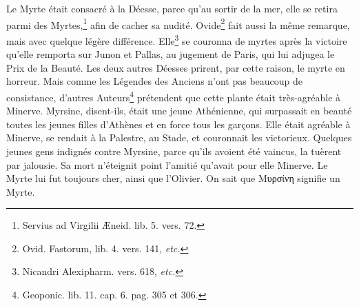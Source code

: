 \documentclass[a4paper, 11pt, oneside, polutonikogreek, french]{article}
\begin{document}
Le Myrte était consacré à la Déesse, parce qu'au sortir de la mer, elle se retira parmi des Myrtes,\footnote{Servius ad Virgilii Æneid. lib. 5. vers. 72.} afin de cacher sa nudité. Ovide\footnote{Ovid. Fastorum, lib. 4. vers. 141, \emph{etc.}} fait aussi la même remarque, mais avec quelque légère différence. Elle\footnote{Nicandri Alexipharm. vers. 618, \emph{etc.}} se couronna de myrtes après la victoire qu'elle remporta sur Junon et Pallas, au jugement de Paris, qui lui adjugea le Prix de la Beauté. Les deux autres Déesses prirent, par cette raison, le myrte en horreur. Mais comme les Légendes des Anciens n'ont pas beaucoup de consistance, d'autres Auteurs\footnote{Geoponic. lib. 11. cap. 6. pag. 305 et 306.} prétendent que cette plante était très-agréable à Minerve. Myrsine, disent-ils, était une jeune Athénienne, qui surpassait en beauté toutes les jeunes filles d'Athènes et en force tous les garçons. Elle était agréable à Minerve, se rendait à la Palestre, au Stade, et couronnait les victorieux. Quelques jeunes gens indignés contre Myrsine, parce qu'ils avoient été vaincus, la tuèrent par jalousie. Sa mort n'éteignit point l'amitié qu'avait pour elle Minerve. Le Myrte lui fut toujours cher, ainsi que l'Olivier. On sait que Μυρσίνη signifie un Myrte.
\end{document}
